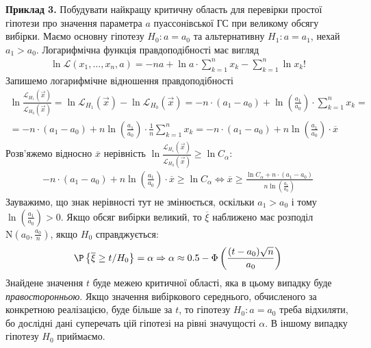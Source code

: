 \vspace{3mm}
\noindent\textbf{Приклад 3.} Побудувати найкращу критичну область для перевірки простої гіпотези про значення параметра $a$
пуассонівської ГС при великому обсягу вибірки.
Маємо основну гіпотезу $H_0 : a = a_0$ та альтернативну $H_1 : a = a_1$, нехай $a_1 > a_0$. Логарифмічна функція правдоподібності має вигляд
\begin{gather*}
    \ln \mathcal{L}(x_1, ..., x_n, a) = -n a + \ln a \cdot \sum\limits_{k=1}^n x_k - \sum\limits_{k=1}^n \ln{x_k!}
\end{gather*}
Запишемо логарифмічне відношення правдоподібності
\begin{gather*}
    \ln \frac{\mathcal{L}_{H_1}(\vec{x})}{\mathcal{L}_{H_0}(\vec{x})} = \ln \mathcal{L}_{H_1}(\vec{x}) - \ln \mathcal{L}_{H_0}(\vec{x}) =
    -n \cdot \left(a_1 - a_0\right) + \ln\left(\frac{a_1}{a_0}\right)\cdot \sum\limits_{k=1}^n x_k = \\
    = -n \cdot \left(a_1 - a_0\right) + n \ln\left(\frac{a_1}{a_0}\right) \cdot \frac{1}{n}\sum\limits_{k=1}^n x_k 
    = -n \cdot \left(a_1 - a_0\right) + n \ln\left(\frac{a_1}{a_0}\right) \cdot \overline{x}
\end{gather*}
Розв'яжемо відносно $\overline{x}$ нерівність $\ln \frac{\mathcal{L}_{H_1}(\vec{x})}{\mathcal{L}_{H_0}(\vec{x})} \geq \ln C_{\alpha}$:
\begin{gather*}
    -n \cdot \left(a_1 - a_0\right) + n \ln\left(\frac{a_1}{a_0}\right) \cdot \overline{x} \geq \ln C_{\alpha} \Leftrightarrow
    \overline{x} \geq \frac{\ln C_{\alpha} + n \cdot \left(a_1 - a_0\right)}{n \ln\left(\frac{a_1}{a_0}\right)}
\end{gather*}
Зауважимо, що знак нерівності тут не змінюється, оскільки $a_1 > a_0$ і тому $\ln\left(\frac{a_1}{a_0}\right) > 0$.
Якщо обсяг вибірки великий, то $\overline{\xi}$ наближено має розподіл $\mathrm{N}\left(a_0, \frac{a_0}{n}\right)$, якщо $H_0$ справджується:
\begin{gather*}
    \P \left\{\overline{\xi} \geq t / H_0 \right\} = \alpha \Rightarrow \alpha \approx 0.5 - \Phi\left(\frac{(t - a_0)\sqrt{n}}{a_0}\right)
\end{gather*}
Знайдене значення $t$ буде межею критичної області, яка в цьому випадку буде \emph{правосторонньою}.
Якщо значення вибіркового середнього, обчисленого за конкретною 
реалізацією, буде більше за $t$, то гіпотезу $H_0 : a = a_0$ треба відхиляти, бо дослідні дані суперечать цій 
гіпотезі на рівні значущості $\alpha$. В іншому випадку гіпотезу $H_0$ приймаємо.

